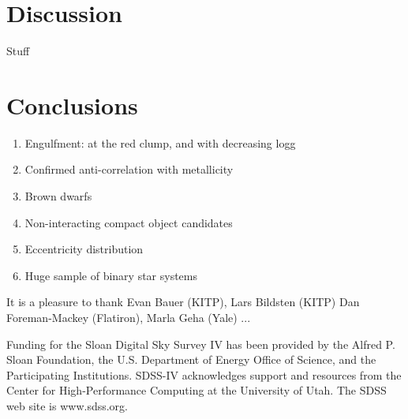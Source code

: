 \documentclass[modern]{aastex63}
\begin{document}




\section{Discussion}

Stuff


\section{Conclusions}

\begin{enumerate}
    \item Engulfment: at the red clump, and with decreasing logg
    \item Confirmed anti-correlation with metallicity
    \item Brown dwarfs
    \item Non-interacting compact object candidates
    \item Eccentricity distribution
    \item Huge sample of binary star systems
\end{enumerate}


\acknowledgements

It is a pleasure to thank
Evan Bauer (KITP),
Lars Bildsten (KITP)
Dan Foreman-Mackey (Flatiron),
Marla Geha (Yale)
...

Funding for the Sloan Digital Sky Survey IV has been provided by the Alfred P.
Sloan Foundation, the U.S. Department of Energy Office of Science, and the
Participating Institutions. SDSS-IV acknowledges support and resources from the
Center for High-Performance Computing at the University of Utah. The SDSS web
site is www.sdss.org.
\end{document}
